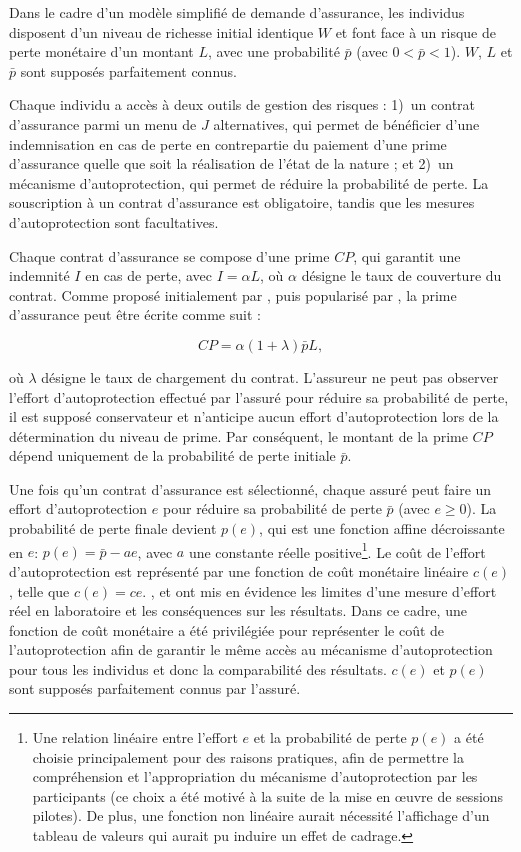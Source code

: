 \begin{Article}
\begin{refsection}[Mouminoux]
Dans le cadre d'un modèle simplifié de demande d'assurance, les individus disposent d'un niveau de richesse initial identique $W$ et font face à un risque de perte monétaire d'un montant $L$, avec une probabilité $\bar{p}$ (avec $0 < \bar{p} < 1$). $W$, $L$ et $\bar{p}$ sont supposés parfaitement connus.

Chaque individu a accès à deux outils de gestion des risques : 1)~un contrat d'assurance parmi un menu de $J$ alternatives, qui  permet de bénéficier d'une indemnisation en cas de perte en contrepartie du paiement d'une prime d'assurance quelle que soit la réalisation de l'état de la nature ; et 2)~un mécanisme d'autoprotection, qui  permet de réduire la probabilité de perte. La souscription à un contrat d'assurance est obligatoire, tandis que les mesures d'autoprotection sont facultatives.

Chaque contrat d'assurance se compose d'une prime $CP$, qui garantit une indemnité $I$ en cas de perte, avec $I=\alpha L$, où $\alpha$ désigne le taux de couverture du contrat. Comme proposé initialement par \textcite{m68}, puis popularisé par \textcite{s00}, la prime d'assurance peut être écrite comme suit :

\begin{equation}
\label{eq:premium}
CP = \alpha(1+\lambda)\bar{p}L,
\end{equation}

\noindent où $\lambda$ désigne le taux de chargement du contrat. L'assureur ne peut pas observer l'effort d'autoprotection effectué par l'assuré pour réduire sa probabilité de perte, il est supposé conservateur et n'anticipe aucun effort d'autoprotection lors de la détermination du niveau de prime. Par conséquent, le montant de la prime $CP$ dépend uniquement de la probabilité de perte initiale $\bar{p}$.

Une fois qu'un contrat d'assurance est sélectionné, chaque assuré peut faire un effort d'autoprotection $e$ pour réduire sa probabilité de perte $\bar{p}$ (avec $e \ge 0$). La probabilité de perte finale devient $p(e)$, qui est une fonction affine décroissante en $e$: $p(e)=\bar{p} - a e$, avec $a$ une constante réelle positive\footnote{Une relation linéaire entre l'effort $e$ et la probabilité de perte $p(e)$ a été choisie principalement pour des raisons pratiques, afin de permettre la compréhension et l'appropriation du mécanisme d'autoprotection par les participants (ce choix a été motivé à la suite de la mise en \oe uvre de sessions pilotes). De plus, une fonction non linéaire aurait nécessité l'affichage d'un tableau de valeurs qui aurait pu induire un effet de cadrage.}. Le coût de l'effort d'autoprotection est représenté par une fonction de coût monétaire linéaire $c(e)$, telle que $c(e)=c e$. \textcite{Araujo_etal2016}, \textcite{cgh18} et \textcite{gp19} ont mis en évidence les limites d'une mesure d'effort réel en laboratoire et les conséquences sur les résultats. Dans ce cadre, une fonction de coût monétaire a été privilégiée pour représenter le coût de l'autoprotection afin de garantir le même accès au mécanisme d'autoprotection pour tous les individus et donc la comparabilité des résultats. $c(e)$ et $p(e)$ sont supposés parfaitement connus par l'assuré.


\end{refsection}
\end{Article}
